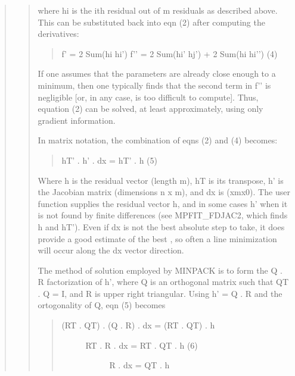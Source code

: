 \documentclass[letterpaper,10pt,english]{sphinxmanual}
\begin{document}
\begin{quote}
\begin{quote}
where hi is the ith residual out of m residuals as described
above.  This can be substituted back into eqn (2) after computing
the derivatives:
\begin{quote}

f’  = 2 Sum(hi  hi’)
f’’ = 2 Sum(hi’ hj’) + 2 Sum(hi hi’’)                                (4)
\end{quote}

If one assumes that the parameters are already close enough to a
minimum, then one typically finds that the second term in f’’ is
negligible {[}or, in any case, is too difficult to compute{]}.  Thus,
equation (2) can be solved, at least approximately, using only
gradient information.

In matrix notation, the combination of eqns (2) and (4) becomes:
\begin{quote}

hT’ . h’ . dx = \sphinxhyphen{} hT’ . h                                                 (5)
\end{quote}

Where h is the residual vector (length m), hT is its transpose, h’
is the Jacobian matrix (dimensions n x m), and dx is (xm\sphinxhyphen{}x0).  The
user function supplies the residual vector h, and in some cases h’
when it is not found by finite differences (see MPFIT\_FDJAC2,
which finds h and hT’).  Even if dx is not the best absolute step
to take, it does provide a good estimate of the best ,
so often a line minimization will occur along the dx vector
direction.

The method of solution employed by MINPACK is to form the Q . R
factorization of h’, where Q is an orthogonal matrix such that QT .
Q = I, and R is upper right triangular.  Using h’ = Q . R and the
ortogonality of Q, eqn (5) becomes
\begin{quote}
\begin{description}
\item[{(RT . QT) . (Q . R) . dx = \sphinxhyphen{} (RT . QT) . h}] \leavevmode\begin{description}
\item[{RT . R . dx = \sphinxhyphen{} RT . QT . h             (6)}] \leavevmode
R . dx = \sphinxhyphen{} QT . h

\end{description}

\end{description}
\end{quote}


\end{quote}
\end{quote}
\end{document}
